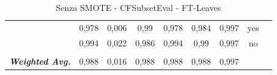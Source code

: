 \begin{table}[htbp]
{\begin{tabular}{rrrrrrrrr}
			\multicolumn{1}{c}{} & \multicolumn{1}{c}{0,978} & \multicolumn{1}{c}{0,006} & \multicolumn{1}{c}{0,99} & \multicolumn{1}{c}{0,978} & \multicolumn{1}{c}{0,984} & \multicolumn{1}{c}{0,997} & \multicolumn{1}{c}{yes} &  \\
			\multicolumn{1}{c}{} & \multicolumn{1}{c}{0,994} & \multicolumn{1}{c}{0,022} & \multicolumn{1}{c}{0,986} & \multicolumn{1}{c}{0,994} & \multicolumn{1}{c}{0,99} & \multicolumn{1}{c}{0,997} & \multicolumn{1}{c}{no} &  \\
			\multicolumn{1}{c}{} & \multicolumn{1}{c}{} & \multicolumn{1}{c}{} & \multicolumn{1}{c}{} & \multicolumn{1}{c}{} & \multicolumn{1}{c}{} & \multicolumn{1}{c}{} & \multicolumn{1}{c}{} &  \\
			\multicolumn{1}{c}{\textit{\textbf{Weighted Avg.}}} & \multicolumn{1}{c}{0,988} & \multicolumn{1}{c}{0,016} & \multicolumn{1}{c}{0,988} & \multicolumn{1}{c}{0,988} & \multicolumn{1}{c}{0,988} & \multicolumn{1}{c}{0,997} & \multicolumn{1}{c}{} &  \\
		\end{tabular}%
	}
	\label{tab:FTLeavesFiltered}%
	\caption{ Senza SMOTE - CFSubsetEval - FT-Leaves}
\end{table}%

